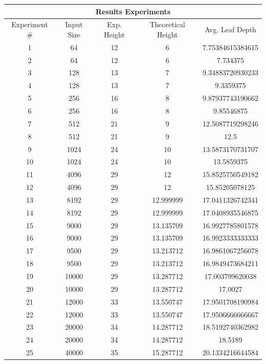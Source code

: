 \documentclass[12pt, a4paper]{article}
\begin{document}
\begin{table}[H]
    \begin{tabular}{|c|c|c|c|c|}
      \hline
      \multicolumn{5}{|c|}{Results Experiments} \\
      \hline
      Experiment \# & Input Size & Exp. Height & Theoretical Height & Avg. Leaf Depth  \\
      \hline
      1 & 64 & 12 & 6 & 7.75384615384615 \\
      2 & 64 & 12 & 6 & 7.734375 \\
      3 & 128 & 13 & 7 & 9.34883720930233 \\
      4 & 128 & 13 & 7 & 9.3359375 \\
      5 & 256 & 16 & 8 & 9.87937743190662 \\
      6 & 256 & 16 & 8 & 9.85546875 \\
      7 & 512 & 21 & 9 & 12.5087719298246 \\
      8 & 512 & 21 & 9 & 12.5 \\
      9 & 1024 & 24 & 10 & 13.5873170731707 \\
      10 & 1024 & 24 & 10 & 13.5859375 \\
      11 & 4096 & 29 & 12 & 15.8525750549182 \\
      12 & 4096 & 29 & 12 & 15.85205078125 \\
      13 & 8192 & 29 & 12.999999 & 17.0411326742341 \\
      14 & 8192 & 29 & 12.999999 & 17.0408935546875 \\
      15 & 9000 & 29 & 13.135709 & 16.9927785801578 \\
      16 & 9000 & 29 & 13.135709 & 16.9923333333333 \\
      17 & 9500 & 29 & 13.213712 & 16.9861067256078 \\
      18 & 9500 & 29 & 13.213712 & 16.9849473684211 \\
      19 & 10000 & 29 & 13.287712 & 17.003799620038 \\
      20 & 10000 & 29 & 13.287712 & 17.0027 \\
      21 & 12000 & 33 & 13.550747 & 17.9501708190984 \\
      22 & 12000 & 33 & 13.550747 & 17.9506666666667 \\
      23 & 20000 & 34 & 14.287712 & 18.5192740362982 \\
      24 & 20000 & 34 & 14.287712 & 18.5189 \\
      25 & 40000 & 35 & 15.287712 & 20.1334216644584 \\

\end{tabular}
\end{table}
\end{document}

